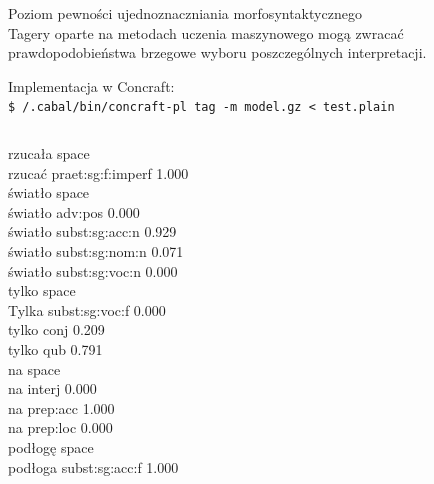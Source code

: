 \documentclass[xcolor=dvipsnames,polish]{beamer}
\newcommand{\textapprox}{\raisebox{0.5ex}{\texttildelow}}
\begin{document}
\begin{frame}{Poziom pewności ujednoznaczniania morfosyntaktycznego}
  \\
  Tagery oparte na metodach uczenia maszynowego mogą zwracać prawdopodobieństwa brzegowe wyboru poszczególnych interpretacji.
  \vspace{0.25cm}

  Implementacja w Concraft:\\
  \texttt{\$ \textapprox/.cabal/bin/concraft-pl\ tag\ -m\ model.gz\ <\ test.plain}

\begin{columns}[t]
  \scriptsize
  rzucała space\\
  \hspace{1cm}rzucać  praet:sg:f:imperf 1.000\\
  światło space\\
  \hspace{1cm}światło adv:pos 0.000\\
  \hspace{1cm}światło subst:sg:acc:n  0.929\\
  \hspace{1cm}światło subst:sg:nom:n  0.071\\
  \hspace{1cm}światło subst:sg:voc:n  0.000\\
  \scriptsize
  tylko space\\
  \hspace{1cm}Tylka   subst:sg:voc:f  0.000\\
  \hspace{1cm}tylko   conj    0.209\\
  \hspace{1cm}tylko   qub     0.791\\
  na    space\\
  \hspace{1cm}na      interj  0.000\\
  \hspace{1cm}na      prep:acc        1.000\\
  \hspace{1cm}na      prep:loc        0.000\\
  podłogę space\\
  \hspace{1cm}podłoga subst:sg:acc:f  1.000\\
\end{columns}

\end{frame}
\end{document}
